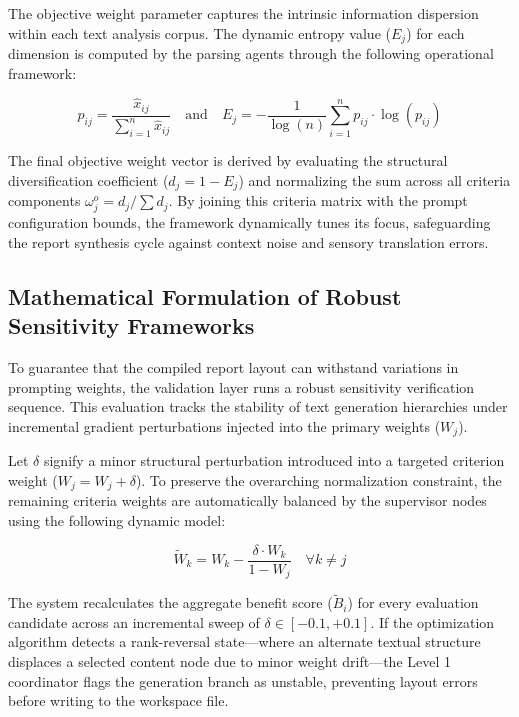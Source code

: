 The objective weight parameter captures the intrinsic information dispersion within each text analysis corpus. The dynamic entropy value (\(E_{j}\)) for each dimension is computed by the parsing agents through the following operational framework:

\begin{equation}
p_{ij} = \frac{\hat{x}_{ij}}{\sum_{i=1}^{n} \hat{x}_{ij}} \quad \text{and} \quad E_{j} = -\frac{1}{\log(n)} \sum_{i=1}^{n} p_{ij} \cdot \log(p_{ij})
\end{equation}

The final objective weight vector is derived by evaluating the structural diversification coefficient (\(d_{j} = 1 - E_{j}\)) and normalizing the sum across all criteria components $\omega_{j}^{o} = d_{j}/\sum d_{j}$. By joining this criteria matrix with the prompt configuration bounds, the framework dynamically tunes its focus, safeguarding the report synthesis cycle against context noise and sensory translation errors.

\subsection{Mathematical Formulation of Robust Sensitivity Frameworks}
To guarantee that the compiled report layout can withstand variations in prompting weights, the validation layer runs a robust sensitivity verification sequence. This evaluation tracks the stability of text generation hierarchies under incremental gradient perturbations injected into the primary weights (\(W_{j}\)). 

Let \(\delta\) signify a minor structural perturbation introduced into a targeted criterion weight (\(W_{j} = W_{j} + \delta\)). To preserve the overarching normalization constraint, the remaining criteria weights are automatically balanced by the supervisor nodes using the following dynamic model:

\begin{equation}
\tilde{W}_{k} = W_{k} - \frac{\delta \cdot W_{k}}{1 - W_{j}} \quad \forall k \neq j
\end{equation}

The system recalculates the aggregate benefit score (\(\tilde{B}_{i}\)) for every evaluation candidate across an incremental sweep of \(\delta \in [-0.1, +0.1]\). If the optimization algorithm detects a rank-reversal state—where an alternate textual structure displaces a selected content node due to minor weight drift—the Level 1 coordinator flags the generation branch as unstable, preventing layout errors before writing to the workspace file.


